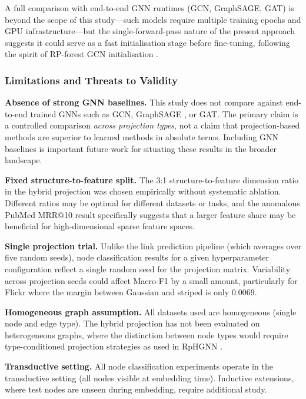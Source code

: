 \documentclass[conference]{IEEEtran}
\begin{document}
A full comparison with end-to-end GNN runtimes (GCN, GraphSAGE, GAT) is
beyond the scope of this study---such models require multiple training
epochs and GPU infrastructure---but the single-forward-pass nature of the
present approach suggests it could serve as a fast initialisation stage
before fine-tuning, following the spirit of RP-forest GCN initialisation
\cite{alshammari2020rpforest}.

\subsubsection{Limitations and Threats to Validity}

\textbf{Absence of strong GNN baselines.}
This study does not compare against end-to-end trained GNNs such as GCN,
GraphSAGE \cite{khemani2024}, or GAT. The primary claim is a controlled
comparison \emph{across projection types}, not a claim that projection-based
methods are superior to learned methods in absolute terms. Including GNN
baselines is important future work for situating these results in the
broader landscape.

\textbf{Fixed structure-to-feature split.}
The 3:1 structure-to-feature dimension ratio in the hybrid projection was
chosen empirically without systematic ablation. Different ratios may be
optimal for different datasets or tasks, and the anomalous PubMed MRR@10
result specifically suggests that a larger feature share may be beneficial
for high-dimensional sparse feature spaces.

\textbf{Single projection trial.}
Unlike the link prediction pipeline (which averages over five random seeds),
node classification results for a given hyperparameter configuration reflect
a single random seed for the projection matrix. Variability across projection
seeds could affect Macro-F1 by a small amount, particularly for Flickr where
the margin between Gaussian and striped is only 0.0069.

\textbf{Homogeneous graph assumption.}
All datasets used are homogeneous (single node and edge type). The hybrid
projection has not been evaluated on heterogeneous graphs, where the
distinction between node types would require type-conditioned projection
strategies as used in RpHGNN \cite{hu2021rphgnn}.

\textbf{Transductive setting.}
All node classification experiments operate in the transductive setting
(all nodes visible at embedding time). Inductive extensions, where test
nodes are unseen during embedding, require additional study.
\end{document}
